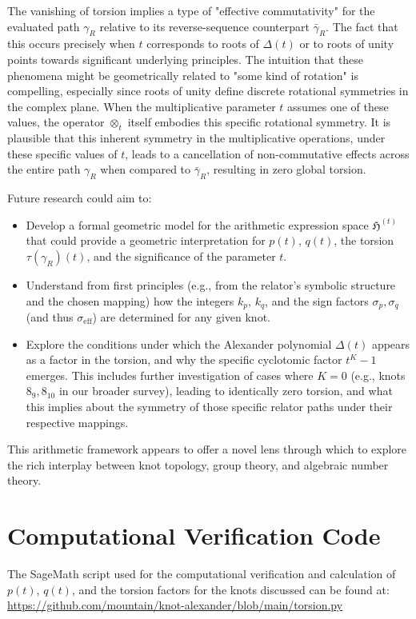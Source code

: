 \documentclass{article}[a4paper,12pt]
\begin{document}
The vanishing of torsion implies a type of "effective commutativity" for the evaluated path $\gamma_R$ relative to its reverse-sequence counterpart $\bar{\gamma}_R$. The fact that this occurs precisely when $t$ corresponds to roots of $\Delta(t)$ or to roots of unity points towards significant underlying principles. The intuition that these phenomena might be geometrically related to "some kind of rotation" is compelling, especially since roots of unity define discrete rotational symmetries in the complex plane. When the multiplicative parameter $t$ assumes one of these values, the operator $\otimes_t$ itself embodies this specific rotational symmetry. It is plausible that this inherent symmetry in the multiplicative operations, under these specific values of $t$, leads to a cancellation of non-commutative effects across the entire path $\gamma_R$ when compared to $\bar{\gamma}_R$, resulting in zero global torsion.

Future research could aim to:
\begin{itemize}
    \item Develop a formal geometric model for the arithmetic expression space $\mathfrak{H}^{(t)}$ that could provide a geometric interpretation for $p(t)$, $q(t)$, the torsion $\tau(\gamma_R)(t)$, and the significance of the parameter $t$.
    \item Understand from first principles (e.g., from the relator's symbolic structure and the chosen mapping) how the integers $k_p$, $k_q$, and the sign factors $\sigma_p, \sigma_q$ (and thus $\sigma_{\text{eff}}$) are determined for any given knot.
    \item Explore the conditions under which the Alexander polynomial $\Delta(t)$ appears as a factor in the torsion, and why the specific cyclotomic factor $t^K-1$ emerges. This includes further investigation of cases where $K=0$ (e.g., knots $8_9, 8_{10}$ in our broader survey), leading to identically zero torsion, and what this implies about the symmetry of those specific relator paths under their respective mappings.
\end{itemize}
This arithmetic framework appears to offer a novel lens through which to explore the rich interplay between knot topology, group theory, and algebraic number theory.

\section{Computational Verification Code}

The SageMath script used for the computational verification and calculation of $p(t)$, $q(t)$, and the torsion factors for the knots discussed can be found at:
\url{https://github.com/mountain/knot-alexander/blob/main/torsion.py}
\end{document}
